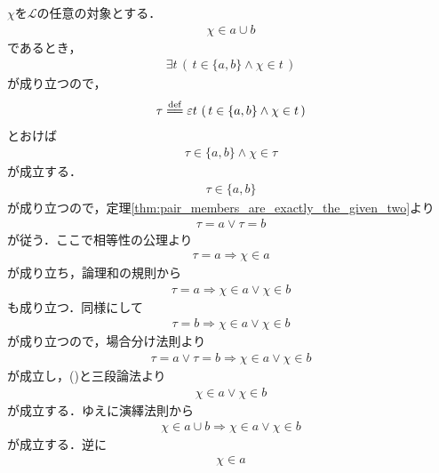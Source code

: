 	\begin{sketch}
		$\chi$を$\mathcal{L}$の任意の対象とする．
		\begin{align}
			\chi \in a \cup b
		\end{align}
		であるとき，
		\begin{align}
			\exists t\, \left(\, t \in \{a,b\} \wedge \chi \in t\, \right)
		\end{align}
		が成り立つので，
		\begin{align}
			\tau \defeq \varepsilon t\, \left(\, t \in \{a,b\} \wedge \chi \in t\, \right)
		\end{align}
		とおけば
		\begin{align}
			\tau \in \{a,b\} \wedge \chi \in \tau
		\end{align}
		が成立する．
		\begin{align}
			\tau \in \{a,b\}
		\end{align}
		が成り立つので，定理\ref{thm:pair_members_are_exactly_the_given_two}より
		\begin{align}
			\tau = a \vee \tau = b
			\label{fom:thm_union_of_pair_is_union_of_their_elements_1}
		\end{align}
		が従う．ここで相等性の公理より
		\begin{align}
			\tau = a \Longrightarrow \chi \in a
		\end{align}
		が成り立ち，論理和の規則から
		\begin{align}
			\tau = a \Longrightarrow \chi \in a \vee \chi \in b
		\end{align}
		も成り立つ．同様にして
		\begin{align}
			\tau = b \Longrightarrow \chi \in a \vee \chi \in b
		\end{align}
		が成り立つので，場合分け法則より
		\begin{align}
			\tau = a \vee \tau = b \Longrightarrow \chi \in a \vee \chi \in b
		\end{align}
		が成立し，()と三段論法より
		\begin{align}
			\chi \in a \vee \chi \in b
		\end{align}
		が成立する．ゆえに演繹法則から
		\begin{align}
			\chi \in a \cup b \Longrightarrow \chi \in a \vee \chi \in b
			\label{fom:thm_union_of_pair_is_union_of_their_elements_2}
		\end{align}
		が成立する．逆に
		\begin{align}
			\chi \in a
		\end{align}

\end{sketch}
